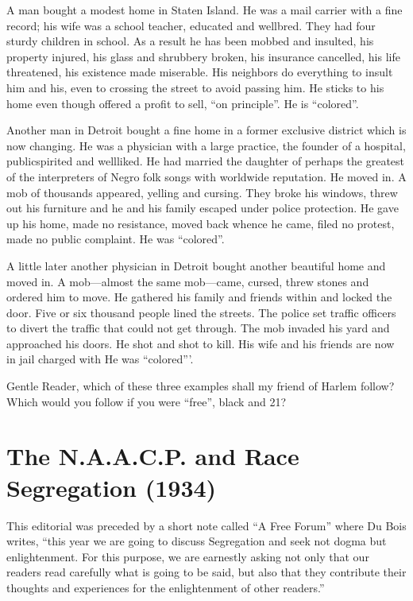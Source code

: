 \documentclass[letterpaper,10pt,english]{jupyterBook}
\begin{document}
\sphinxAtStartPar
{} A man bought a modest home in Staten Island. He was a mail carrier with a fine record; his wife was a school teacher, educated and well\sphinxhyphen{}bred. They had four sturdy children in school. As a result he has been mobbed and insulted, his property injured, his glass and shrubbery broken, his insurance cancelled, his life threatened, his existence made miserable.  His neighbors do everything to insult him and his, even to crossing the street to avoid passing him. He sticks to his home even though offered a profit to sell, “on principle”. He is “colored”.

\sphinxAtStartPar
Another man in Detroit bought a fine home in a former exclusive district which is now changing. He was a physician with a large practice, the founder of a hospital, public\sphinxhyphen{}spirited and well\sphinxhyphen{}liked. He had married the daughter of perhaps the greatest of the interpreters of Negro folk songs with world\sphinxhyphen{}wide reputation. He moved in. A mob of thousands appeared, yelling and cursing. They broke his windows, threw out his furniture and he and his family escaped under police protection. He gave up his home, made no resistance, moved back whence he came, filed no protest, made no public complaint. He was “colored”.

\sphinxAtStartPar
A little later another physician in Detroit bought another beautiful home and moved in. A mob—almost the same mob—came, cursed, threw stones and ordered him to move. He gathered his family and friends within and locked the door. Five or six thousand people lined the streets. The police set traffic officers to divert the traffic that could not get through. The mob invaded his yard and approached his doors. He shot and shot to kill. His wife and his friends are now in jail charged with  He was “colored”’.

\sphinxAtStartPar
Gentle Reader, which of these three examples shall my friend of Harlem follow? Which would you follow if you were “free”, black and 21?


\section{The N.A.A.C.P. and Race Segregation (1934)}
\label{\detokenize{Volumes/41/02/naacp_and_race_segregation:the-n-a-a-c-p-and-race-segregation-1934}}\label{\detokenize{Volumes/41/02/naacp_and_race_segregation::doc}}
\begin{sphinxShadowBox}
\sphinxstylesidebartitle{}

\sphinxAtStartPar
This editorial was preceded by a short note called “A Free Forum” where Du Bois writes, “this year we are going to discuss Segregation and seek not dogma but enlightenment. For this purpose, we are earnestly asking not only that our readers read carefully what is going to be said, but also that they contribute their thoughts and experiences for the enlightenment of other
readers.”
\end{sphinxShadowBox}
\end{document}
